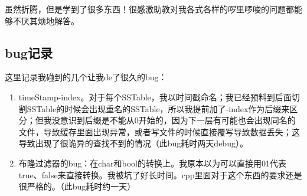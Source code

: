 \documentclass[fontset=windows]{article}
\begin{document}
虽然折腾，但是学到了很多东西！很感激助教对我各式各样的啰里啰唆的问题都能够不厌其烦地解答。

\subsection{bug记录}
这里记录我碰到的几个让我de了很久的bug：
\begin{enumerate}
    \item timeStamp-index。对于每个SSTable，我以时间戳命名；我已经预料到后面切割SSTable的时候会出现重名的SSTable，所以我提前加了-index作为后缀来区分；但我没意识到后缀是不能从0开始的，因为下一层有可能也会出现同名的文件，导致缓存里面出现异常，或者写文件的时候直接覆写导致数据丢失；这导致出现了很诡异的查找不到的情况（此bug耗时两天debug）。
    \item 布隆过滤器的bug：在char和bool的转换上。我原本以为可以直接用01代表true、false来直接转换。我被坑了好长时间。cpp里面对于这个东西的要求还是很严格的。（此bug耗时约一天）
\end{enumerate}
\end{document}
